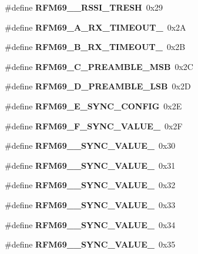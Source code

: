 \begin{DoxyCompactItemize}
\mbox{\label{_r_f_m69__registri_8h_ad2dc326df8fcc7f9a07da7dde7488c18}} 
\#define {\bfseries R\+F\+M69\+\_\+\_\+\+R\+S\+S\+I\+\_\+\+T\+R\+E\+SH}~0x29
\item 
\mbox{\label{_r_f_m69__registri_8h_af62e5cbd477f7cb9047dc4174ef3fd68}} 
\#define {\bfseries R\+F\+M69\+\_\+A\+\_\+\+R\+X\+\_\+\+T\+I\+M\+E\+O\+U\+T\+\_}~0x2A
\item 
\mbox{\label{_r_f_m69__registri_8h_a5e14e523a1d2eab3242d27ffc7155cee}} 
\#define {\bfseries R\+F\+M69\+\_\+B\+\_\+\+R\+X\+\_\+\+T\+I\+M\+E\+O\+U\+T\+\_}~0x2B
\item 
\mbox{\label{_r_f_m69__registri_8h_aa07d4a86e035f7b2f6d0ed287702b53b}} 
\#define {\bfseries R\+F\+M69\+\_\+C\+\_\+\+P\+R\+E\+A\+M\+B\+L\+E\+\_\+\+M\+SB}~0x2C
\item 
\mbox{\label{_r_f_m69__registri_8h_a30429968e68e895c6b22ae0033bc779c}} 
\#define {\bfseries R\+F\+M69\+\_\+D\+\_\+\+P\+R\+E\+A\+M\+B\+L\+E\+\_\+\+L\+SB}~0x2D
\item 
\mbox{\label{_r_f_m69__registri_8h_a34544e4d513d63780f2c84f32c69bafc}} 
\#define {\bfseries R\+F\+M69\+\_\+E\+\_\+\+S\+Y\+N\+C\+\_\+\+C\+O\+N\+F\+IG}~0x2E
\item 
\mbox{\label{_r_f_m69__registri_8h_a73dbb99795060b683a433d6ebeefd3ab}} 
\#define {\bfseries R\+F\+M69\+\_\+F\+\_\+\+S\+Y\+N\+C\+\_\+\+V\+A\+L\+U\+E\+\_}~0x2F
\item 
\mbox{\label{_r_f_m69__registri_8h_ac47c271c5d13eb39d307f1a9553a37d3}} 
\#define {\bfseries R\+F\+M69\+\_\+\_\+\+S\+Y\+N\+C\+\_\+\+V\+A\+L\+U\+E\+\_}~0x30
\item 
\mbox{\label{_r_f_m69__registri_8h_a32a1ac893692f6313726fb42e9b94a42}} 
\#define {\bfseries R\+F\+M69\+\_\+\_\+\+S\+Y\+N\+C\+\_\+\+V\+A\+L\+U\+E\+\_}~0x31
\item 
\mbox{\label{_r_f_m69__registri_8h_aba71143eda7113f18d91ea51e37946f1}} 
\#define {\bfseries R\+F\+M69\+\_\+\_\+\+S\+Y\+N\+C\+\_\+\+V\+A\+L\+U\+E\+\_}~0x32
\item 
\mbox{\label{_r_f_m69__registri_8h_a380909750d489a09b98c4199a0c38dc1}} 
\#define {\bfseries R\+F\+M69\+\_\+\_\+\+S\+Y\+N\+C\+\_\+\+V\+A\+L\+U\+E\+\_}~0x33
\item 
\mbox{\label{_r_f_m69__registri_8h_afecb7ffd51810a200cc733dcdfb531fc}} 
\#define {\bfseries R\+F\+M69\+\_\+\_\+\+S\+Y\+N\+C\+\_\+\+V\+A\+L\+U\+E\+\_}~0x34
\item 
\mbox{\label{_r_f_m69__registri_8h_a7fd1ef0834f51a028af7b90f5f38c167}} 
\#define {\bfseries R\+F\+M69\+\_\+\_\+\+S\+Y\+N\+C\+\_\+\+V\+A\+L\+U\+E\+\_}~0x35

\end{DoxyCompactItemize}

